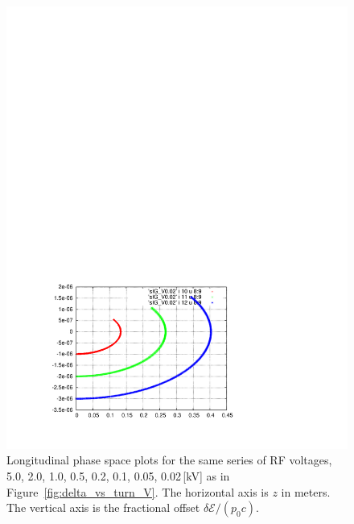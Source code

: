 \documentclass[]{article}
\begin{document}
\begin{figure}[h]
\begin{minipage}[b]{0.45\linewidth}
\includegraphics[scale=0.6]{pdf/delta_vs_ct_V0p02.pdf}
\end{minipage}
%
\caption{\label{fig:delta_vs_ct_V}
Longitudinal phase space plots for the same series of RF voltages,
5.0, 2.0, 1.0, 0.5, 0.2, 0.1, 0.05, 0.02\,[kV] as in 
Figure~\ref{fig:delta_vs_turn_V}. The horizontal axis is $z$ in meters.
The vertical axis is the fractional offset 
$\delta{\mathcal{E}}/(p_0c)$.
}
\end{figure}
%
\hoffset -0.5cm
\clearpage
\hoffset 0.5cm
\end{document}
